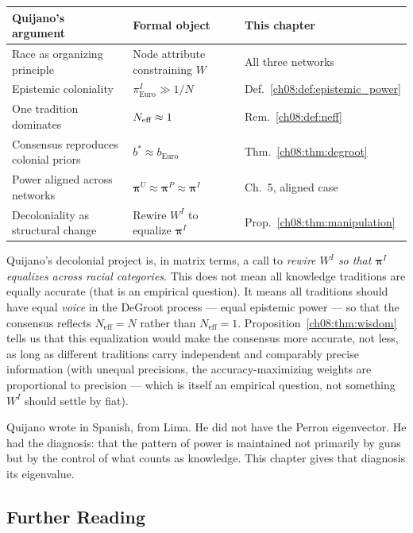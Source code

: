 \documentclass[../structural_economics_book.tex]{subfiles}
\begin{document}
\begin{center}
\begin{tabularx}{\textwidth}{LLL}
\toprule
\textbf{Quijano's argument} & \textbf{Formal object} & \textbf{This chapter} \\
\midrule
Race as organizing principle & Node attribute constraining $W$ & All three networks \\
Epistemic coloniality & $\pi^I_{\text{Euro}} \gg 1/N$ & Def.~\ref{ch08:def:epistemic_power} \\
One tradition dominates & $N_{\text{eff}} \approx 1$ & Rem.~\ref{ch08:def:neff} \\
Consensus reproduces colonial priors & $b^* \approx b_{\text{Euro}}$ & Thm.~\ref{ch08:thm:degroot} \\
Power aligned across networks & $\boldsymbol{\pi}^U \approx \boldsymbol{\pi}^P \approx \boldsymbol{\pi}^I$ & Ch.~5, aligned case \\
Decoloniality as structural change & Rewire $W^I$ to equalize $\boldsymbol{\pi}^I$ & Prop.~\ref{ch08:thm:manipulation} \\
\bottomrule
\end{tabularx}
\end{center}

Quijano's decolonial project is, in matrix terms, a call to \textit{rewire $W^I$ so that $\boldsymbol{\pi}^I$ equalizes across racial categories}. This does not mean all knowledge traditions are equally accurate (that is an empirical question). It means all traditions should have equal \textit{voice} in the DeGroot process --- equal epistemic power --- so that the consensus reflects $N_{\text{eff}} = N$ rather than $N_{\text{eff}} = 1$. Proposition~\ref{ch08:thm:wisdom} tells us that this equalization would make the consensus more accurate, not less, as long as different traditions carry independent and comparably precise information (with unequal precisions, the accuracy-maximizing weights are proportional to precision --- which is itself an empirical question, not something $W^I$ should settle by fiat).

Quijano wrote in Spanish, from Lima. He did not have the Perron eigenvector. He had the diagnosis: that the pattern of power is maintained not primarily by guns but by the control of what counts as knowledge. This chapter gives that diagnosis its eigenvalue.


\subsection*{Further Reading}
\end{document}
